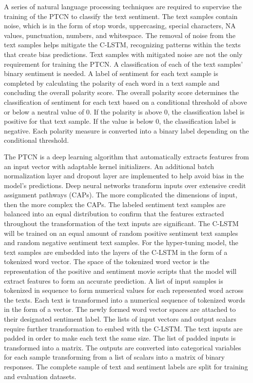 \documentclass[conference,final,]{IEEEtran}
\begin{document}
A series of natural language processing techniques are required to supervise the training of the PTCN to classify the text sentiment.
The text samples contain noise, which is in the form of stop words, uppercasing, special characters, NA values, punctuation, numbers, and whitespace.
The removal of noise from the text samples helps mitigate the C-LSTM, recognizing patterns within the texts that create bias predictions.
Text samples with mitigated noise are not the only requirement for training the PTCN.
A classification of each of the text samples' binary sentiment is needed.
A label of sentiment for each text sample is completed by calculating the polarity of each word in a text sample and concluding the overall polarity score.
The overall polarity score determines the classification of sentiment for each text based on a conditional threshold of above or below a neutral value of 0.
If the polarity is above 0, the classification label is positive for that text sample.
If the value is below 0, the classification label is negative.
Each polarity measure is converted into a binary label depending on the conditional threshold.

The PTCN is a deep learning algorithm that automatically extracts features from an input vector with adaptable kernel initializers.
An additional batch normalization layer and dropout layer are implemented to help avoid bias in the model's predictions. Deep neural networks transform inputs over extensive credit assignment pathways (CAPs).
The more complicated the dimensions of input, then the more complex the CAPs.
The labeled sentiment text samples are balanced into an equal distribution to confirm that the features extracted throughout the transformation of the text inputs are significant.
The C-LSTM will be trained on an equal amount of random positive sentiment text samples and random negative sentiment text samples.
For the hyper-tuning model, the text samples are embedded into the layers of the C-LSTM in the form of a tokenized word vector.
The space of the tokenized word vector is the representation of the positive and sentiment movie scripts that the model will extract features to form an accurate prediction.
A list of input samples is tokenized in sequence to form numerical values for each represented word across the texts.
Each text is transformed into a numerical sequence of tokenized words in the form of a vector.
The newly formed word vector spaces are attached to their designated sentiment label.
The lists of input vectors and output scalars require further transformation to embed with the C-LSTM. The text inputs are padded in order to make each text the same size.
The list of padded inputs is transformed into a matrix. The outputs are converted into categorical variables for each sample transforming from a list of scalars into a matrix of binary responses.
The complete sample of text and sentiment labels are split for training and evaluation datasets.
\end{document}
